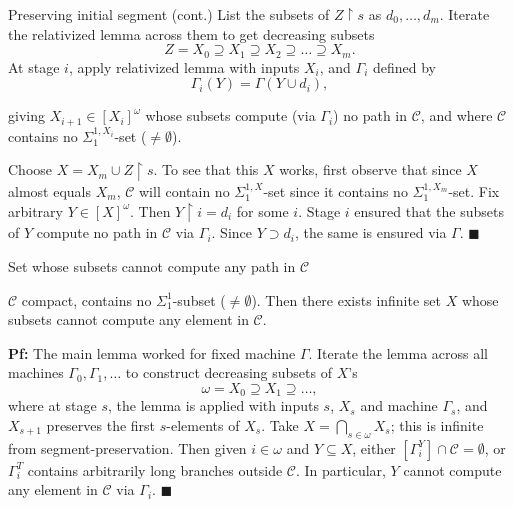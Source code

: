 \begin{frame}{Preserving initial segment (cont.)}
  List the subsets of $Z\restriction s$ as $d_0,\ldots,d_m$. Iterate the
  relativized lemma across them to get decreasing subsets
  \[Z=X_0 \supseteq X_1 \supseteq X_2 \supseteq\ldots \supseteq X_m.\]
  At stage $i$, apply relativized lemma with inputs $X_i$, and
  $\Gamma_i$ defined by
  \[\Gamma_i(Y) =\Gamma(Y\cup d_i),\]

  giving $X_{i+1}\in[X_i]^\omega$ whose subsets compute (via
  $\Gamma_i$) no path in $\mathcal{C}$, and where $\mathcal{C}$ contains no
  $\Sigma_1^{1,X_i}$-set ($\neq\emptyset$).

  \vspace{0.5em}
  Choose $X=X_m\cup Z\restriction s$. To see that this $X$ works, first
  observe that since $X$ almost equals $X_m$, $\mathcal{C}$ will
  contain no $\Sigma_1^{1,X}$-set since it contains no
  $\Sigma_1^{1,X_m}$-set. Fix arbitrary $Y\in[X]^\omega$. Then
  $Y\restriction i=d_i$ for some $i$. Stage $i$ ensured that the subsets of
  $Y$ compute no path in $\mathcal{C}$ via $\Gamma_i$. Since $Y\supset
  d_i$, the same is ensured via $\Gamma$. $\blacksquare$
\end{frame}

\begin{frame}{Set whose subsets cannot compute any path in $\mathcal{C}$}
  \begin{main-thm*}
    $\mathcal{C}$ compact, contains no $\Sigma_1^1$-subset
    ($\neq\emptyset$). Then there exists infinite set $X$ whose subsets
    cannot compute any element in $\mathcal{C}$.
  \end{main-thm*}

  \textbf{Pf:} The main lemma worked for fixed machine $\Gamma$. Iterate
  the lemma across all machines $\Gamma_0,\Gamma_1,\ldots$ to construct
  decreasing subsets of $X$'s
  \[\omega= X_0\supseteq X_1\supseteq\ldots,\]
  where at stage $s$, the lemma is applied with inputs $s$, $X_s$ and machine
  $\Gamma_s$, and $X_{s+1}$ preserves the first $s$-elements of $X_s$. Take
  $X=\bigcap_{s\in\omega}X_s$; this is infinite from
  segment-preservation. Then given $i\in\omega$ and $Y\subseteq X$, either
  $[\Gamma_i^Y] \cap \mathcal{C} =\emptyset$, or $\Gamma_i^T$ contains
  arbitrarily long branches outside $\mathcal{C}$. In particular, $Y$
  cannot compute any element in $\mathcal{C}$ via $\Gamma_i$.
  $\blacksquare$
\end{frame}

